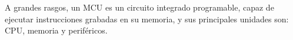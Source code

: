 




A grandes rasgos, un MCU es un circuito integrado programable, capaz de ejecutar instrucciones grabadas en su memoria, y sus principales unidades son: CPU, memoria y periféricos.

